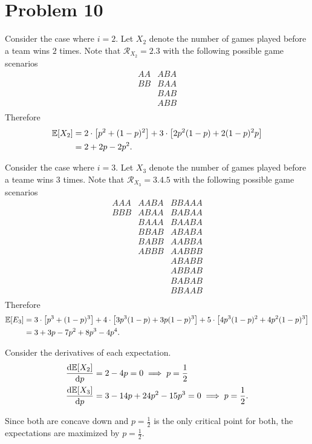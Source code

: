 \documentclass[12pt]{extarticle}
\begin{document}
\section*{Problem 10}
Consider the case where $i = 2$. Let $X_2$ denote the number of games played before a team wins $2$ times. Note that $\mathcal{R}_{X_2} = \qty{2,3}$ with the following possible game scenarios
\[
	\begin{array}{rl}
		AA & ABA \\
		BB & BAA \\
		   & BAB \\
		   & ABB \\
	\end{array}
\]
Therefore
\begin{align*}
	\mathbb{E}\qty[X_2] &= 2\cdot\qty[ p^2 + (1-p)^2 ] + 3\cdot\qty[2p^2(1-p) + 2(1-p)^2 p] \\
	&= 2 + 2 p - 2 p^2
.\end{align*}

Consider the case where $i = 3$. Let $X_3$ denote the number of games played before a teame wins $3$ times. Note that $\mathcal{R}_{X_3} = \qty{3,4,5}$ with the following possible game scenarios
\[
	\begin{array}{rcl}
		AAA & AABA & BBAAA \\
		BBB & ABAA & BABAA \\
		    & BAAA & BAABA \\
		    & BBAB & ABABA \\
		    & BABB & AABBA \\
				& ABBB & AABBB \\
		    &      & ABABB \\
		    &      & ABBAB \\
		    &      & BABAB \\
		    &      & BBAAB \\
	\end{array}
\]
Therefore
\begin{align*}
	\mathbb{E}\qty[E_3] &= 3\cdot\qty[p^3 + (1-p)^3] + 4\cdot\qty[3p^3(1-p) + 3p(1-p)^3] + 5\cdot\qty[4p^3(1-p)^2+4p^2(1-p)^3] \\
						&= 3 + 3p - 7p^2 + 8p^3 - 4p^4
.\end{align*}

Consider the derivatives of each expectation.
\begin{align*}
	\dv{\mathbb{E}\qty[X_2]}{p} &= 2 - 4p = 0 \implies p = \frac{1}{2} \\
	\dv{\mathbb{E}\qty[X_3]}{p} &= 3-14p + 24p^2 - 15p^3 = 0 \implies p = \frac{1}{2}
.\end{align*}

Since both are concave down and $p=\frac{1}{2}$ is the only critical point for both, the expectations are maximized by $p=\frac{1}{2}$.
\end{document}
